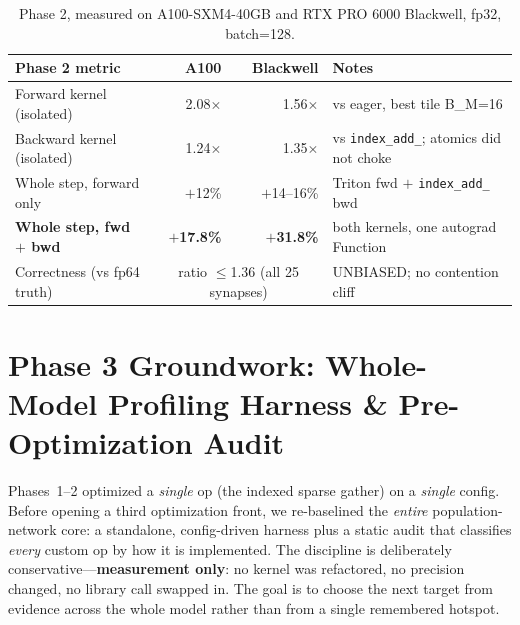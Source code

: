 \documentclass[11pt]{article}
\begin{document}
\begin{table}[h]
\centering
\small
\begin{tabular}{@{}lrrl@{}}
\toprule
\textbf{Phase 2 metric} & \textbf{A100} & \textbf{Blackwell} & \textbf{Notes} \\
\midrule
Forward kernel (isolated) & 2.08$\times$ & 1.56$\times$ & vs eager, best tile B\_M=16 \\
Backward kernel (isolated) & 1.24$\times$ & 1.35$\times$ & vs \texttt{index\_add\_}; atomics did not choke \\
Whole step, forward only & $+$12\% & $+$14--16\% & Triton fwd $+$ \texttt{index\_add\_} bwd \\
\textbf{Whole step, fwd $+$ bwd} & \textbf{$+$17.8\%} & \textbf{$+$31.8\%} & both kernels, one autograd Function \\
Correctness (vs fp64 truth) & \multicolumn{2}{c}{ratio $\le$1.36 (all 25 synapses)} & UNBIASED; no contention cliff \\
\bottomrule
\end{tabular}
\caption{Phase 2, measured on A100-SXM4-40GB and RTX PRO 6000 Blackwell, fp32, batch=128.}
\end{table}

\section{Phase 3 Groundwork: Whole-Model Profiling Harness \& Pre-Optimization Audit}

Phases~1--2 optimized a \emph{single} op (the indexed sparse gather) on a \emph{single}
config. Before opening a third optimization front, we re-baselined the \emph{entire}
population-network core: a standalone, config-driven harness plus a static audit that
classifies \emph{every} custom op by how it is implemented. The discipline is
deliberately conservative---\textbf{measurement only}: no kernel was refactored, no
precision changed, no library call swapped in. The goal is to choose the next target
from evidence across the whole model rather than from a single remembered hotspot.

\begin{center}
\end{center}
\end{document}
